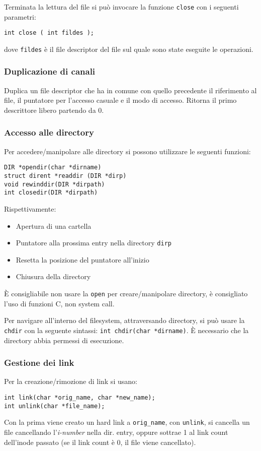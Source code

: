 \documentclass[a4paper]{article}
\begin{document}
Terminata la lettura del file si può invocare la funzione \verb|close| con i seguenti parametri:
\begin{verbatim}
int close ( int fildes );
\end{verbatim}
dove \verb|fildes| è il file descriptor del file sul quale sono state eseguite le operazioni.

\subsubsection{Duplicazione di canali}
Duplica un file descriptor che ha in comune con quello precedente il riferimento al file, il puntatore per l'accesso casuale e il modo di accesso. Ritorna il primo descrittore libero partendo da 0.

\subsubsection{Accesso alle directory}
Per accedere/manipolare alle directory si possono utilizzare le seguenti funzioni:
\begin{verbatim}
DIR *opendir(char *dirname)
struct dirent *readdir (DIR *dirp)
void rewinddir(DIR *dirpath)
int closedir(DIR *dirpath)
\end{verbatim}
Rispettivamente:
\begin{itemize}
\item Apertura di una cartella
\item Puntatore alla prossima entry nella directory \verb|dirp|
\item Resetta la posizione del puntatore all'inizio
\item Chiusura della directory
\end{itemize}
È consigliabile non usare la \verb|open| per creare/manipolare directory, è consigliato l'uso di funzioni C, non system call.

Per navigare all'interno del filesystem, attraversando directory, si può usare la \verb|chdir| con la seguente sintassi:
\verb|int chdir(char *dirname)|. È necessario che la directory abbia permessi di esecuzione.

\subsubsection{Gestione dei link}
Per la creazione/rimozione di link si usano:
\begin{verbatim}
int link(char *orig_name, char *new_name);
int unlink(char *file_name);
\end{verbatim}
Con la prima viene creato un hard link a \verb|orig_name|, con \verb|unlink|, si cancella un file cancellando l'\textit{i-number} nella dir. entry, oppure sottrae 1 al link count dell'inode passato (se il link count è 0, il file viene cancellato).
\end{document}

